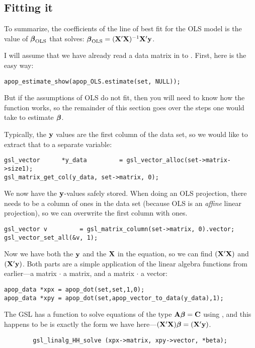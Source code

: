 
\subsection{Fitting it} 
To summarize,
the coefficients of  the line of best fit for the OLS model is the value of ${\mbox{\boldmath$\beta$}}_{\rm OLS}$ that solves:
$ {\mbox{\boldmath$\beta$}}_{\rm OLS} = ({\bf X}'{\bf X})^{-1}{\bf X}'{\bf y}$.

I will assume that we have already read a data matrix in to . First, here is the easy way:
\begin{lstlisting}
apop_estimate_show(apop_OLS.estimate(set, NULL));
\end{lstlisting}
But if the assumptions of OLS do not fit, then you will need to know how
the  function works, so the remainder of this
section goes over the steps one would take to estimate ${\mbox{\boldmath$\beta$}}$.  

Typically, the ${\bf y}$
values are the first column of the data set, so we would like to extract that to a separate variable:
\begin{lstlisting}
gsl_vector      *y_data         = gsl_vector_alloc(set->matrix->size1);
gsl_matrix_get_col(y_data, set->matrix, 0);
\end{lstlisting}

We now have the ${\bf y}$-values safely stored.  When doing an OLS projection,
there needs to be a column of ones in the data set (because OLS is an
{\sl affine} linear projection), so we can overwrite the first column
with ones. 
\begin{lstlisting}
gsl_vector v         = gsl_matrix_column(set->matrix, 0).vector;
gsl_vector_set_all(&v, 1);  
\end{lstlisting}


Now we have both the ${\bf y}$ and the ${\bf X}$ in the equation, so we can find $({\bf X}'{\bf X})$ and $({\bf X}'{\bf y})$.
Both parts are a
simple application of the linear algebra functions from earlier---a matrix $\cdot$ a matrix, and a matrix $\cdot$ a vector:
\begin{lstlisting}
apop_data *xpx = apop_dot(set,set,1,0);
apop_data *xpy = apop_dot(set,apop_vector_to_data(y_data),1);
\end{lstlisting}

The GSL has a function to solve equations of the type ${\bf A} {\mbox{\boldmath$\beta$}} =
{\bf C}$ using , and this happens to be is exactly the form we have here---$({\bf X}'{\bf X}){\mbox{\boldmath$\beta$}} = ({\bf X}'{\bf y})$.  \label{ols}
\begin{lstlisting}
        gsl_linalg_HH_solve (xpx->matrix, xpy->vector, *beta);
\end{lstlisting}

